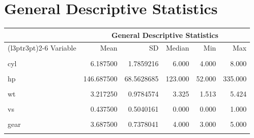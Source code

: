 \documentclass{article}
\begin{document}
\section*{General Descriptive Statistics}
\begin{table}[!h]
\centering
\begin{tabular}{lrrrrr}
\toprule
\multicolumn{1}{c}{ } & \multicolumn{5}{c}{General Descriptive Statistics} \\
\cmidrule(l{3pt}r{3pt}){2-6}
Variable & Mean & SD & Median & Min & Max\\
\midrule
\cellcolor{gray!10}{mpg} & \cellcolor{gray!10}{20.090625} & \cellcolor{gray!10}{6.0269481} & \cellcolor{gray!10}{19.200} & \cellcolor{gray!10}{10.400} & \cellcolor{gray!10}{33.900}\\
cyl & 6.187500 & 1.7859216 & 6.000 & 4.000 & 8.000\\
\cellcolor{gray!10}{disp} & \cellcolor{gray!10}{230.721875} & \cellcolor{gray!10}{123.9386938} & \cellcolor{gray!10}{196.300} & \cellcolor{gray!10}{71.100} & \cellcolor{gray!10}{472.000}\\
hp & 146.687500 & 68.5628685 & 123.000 & 52.000 & 335.000\\
\cellcolor{gray!10}{drat} & \cellcolor{gray!10}{3.596563} & \cellcolor{gray!10}{0.5346787} & \cellcolor{gray!10}{3.695} & \cellcolor{gray!10}{2.760} & \cellcolor{gray!10}{4.930}\\
\addlinespace
wt & 3.217250 & 0.9784574 & 3.325 & 1.513 & 5.424\\
\cellcolor{gray!10}{qsec} & \cellcolor{gray!10}{17.848750} & \cellcolor{gray!10}{1.7869432} & \cellcolor{gray!10}{17.710} & \cellcolor{gray!10}{14.500} & \cellcolor{gray!10}{22.900}\\
vs & 0.437500 & 0.5040161 & 0.000 & 0.000 & 1.000\\
\cellcolor{gray!10}{am} & \cellcolor{gray!10}{0.406250} & \cellcolor{gray!10}{0.4989909} & \cellcolor{gray!10}{0.000} & \cellcolor{gray!10}{0.000} & \cellcolor{gray!10}{1.000}\\
gear & 3.687500 & 0.7378041 & 4.000 & 3.000 & 5.000\\
\addlinespace
\cellcolor{gray!10}{carb} & \cellcolor{gray!10}{2.812500} & \cellcolor{gray!10}{1.6152000} & \cellcolor{gray!10}{2.000} & \cellcolor{gray!10}{1.000} & \cellcolor{gray!10}{8.000}\\
\bottomrule
\end{tabular}
\end{table}

\newpage
\end{document}
